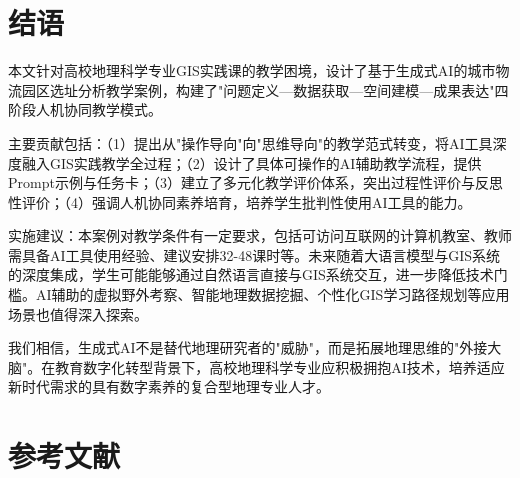 \section{结语}

本文针对高校地理科学专业GIS实践课的教学困境，设计了基于生成式AI的城市物流园区选址分析教学案例，构建了"问题定义—数据获取—空间建模—成果表达"四阶段人机协同教学模式。

主要贡献包括：（1）提出从"操作导向"向"思维导向"的教学范式转变，将AI工具深度融入GIS实践教学全过程；（2）设计了具体可操作的AI辅助教学流程，提供Prompt示例与任务卡；（3）建立了多元化教学评价体系，突出过程性评价与反思性评价；（4）强调人机协同素养培育，培养学生批判性使用AI工具的能力。

实施建议：本案例对教学条件有一定要求，包括可访问互联网的计算机教室、教师需具备AI工具使用经验、建议安排32-48课时等。未来随着大语言模型与GIS系统的深度集成\citep{gai2023}，学生可能能够通过自然语言直接与GIS系统交互，进一步降低技术门槛。AI辅助的虚拟野外考察、智能地理数据挖掘、个性化GIS学习路径规划等应用场景也值得深入探索。

我们相信，生成式AI不是替代地理研究者的"威胁"，而是拓展地理思维的"外接大脑"。在教育数字化转型背景下，高校地理科学专业应积极拥抱AI技术，培养适应新时代需求的具有数字素养的复合型地理专业人才。

\section{参考文献}
\addtolength{\itemsep}{-0.5\baselineskip}

